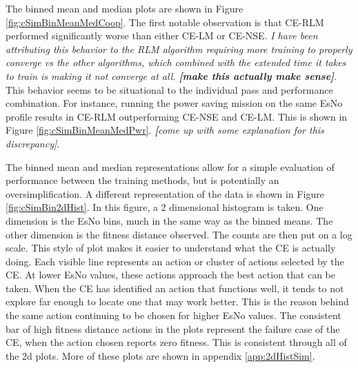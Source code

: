 \par The binned mean and median plots are shown in Figure \ref{fig:cSimBinMeanMedCoop}. The first notable observation is that CE-RLM performed significantly worse than either CE-LM or CE-NSE. \textit{I have been attributing this behavior to the RLM algorithm requiring more training to properly converge vs the other algorithms, which combined with the extended time it takes to train is making it not converge at all. \textbf{[make this actually make sense]}}. This behavior seems to be situational to the individual pass and performance combination. For instance, running the power saving mission on the same EsNo profile results in CE-RLM outperforming CE-NSE and CE-LM. This is shown in Figure \ref{fig:cSimBinMeanMedPwr}. \textit{\textbf[come up with some explanation for this discrepancy]}.  

\par The binned mean and median representations allow for a simple evaluation of performance between the training methods, but is potentially an oversimplification. A different representation of the data is shown in Figure \ref{fig:cSimBin2dHist}. In this figure, a 2 dimensional histogram is taken. One dimension is the EsNo bins, much in the same way as the binned means. The other dimension is the fitness distance observed. The counts are then put on a log scale. This style of plot makes it easier to understand what the CE is actually doing. Each visible line represents an action or cluster of actions selected by the CE. At lower EsNo values, these actions approach the best action that can be taken. When the CE has identified an action that functions well, it tends to not explore far enough to locate one that may work better. This is the reason behind the same action continuing to be chosen for higher EsNo values. The consistent bar of high fitness distance actions in the plots represent the failure case of the CE, when the action chosen reports zero fitness. This is consistent through all of the 2d plots. More of these plots are shown in appendix \ref{app:2dHistSim}.

